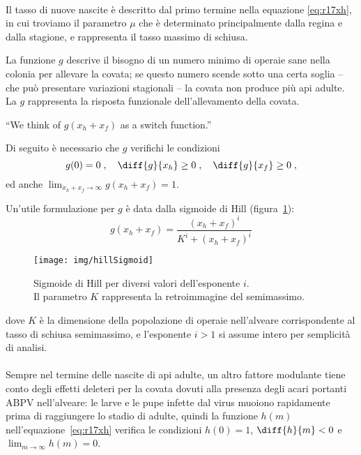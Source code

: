 \paragraph{}
Il tasso di nuove nascite è descritto dal primo termine nella equazione \eqref{eq:r17xh}, in cui troviamo il
parametro $\mu$ che è determinato principalmente dalla regina e dalla stagione, e rappresenta il tasso massimo
di schiusa.

La funzione $g$ descrive il bisogno di un numero minimo di operaie sane nella colonia per allevare la covata; se questo numero scende sotto una certa soglia -- che può presentare variazioni stagionali -- la covata non produce più api adulte.
La $g$ rappresenta la risposta funzionale dell'allevamento della covata.
\begin{displayquote}
``We think of $g(x_h + x_f)$ as a switch function.''
\end{displayquote}

Di seguito è necessario che $g$ verifichi le condizioni
$$g(0)=0 \; , \quad %
\diff{g}{x_h} \geq 0 \; , \quad %
\diff{g}{x_f} \geq 0 \; ,$$
ed anche $\lim_{x_h+x_f \to \infty} g(x_h+x_f)=1$.

Un'utile formulazione per $g$ è data dalla sigmoide di Hill (figura~\ref{img:hillSigmoid}):
\begin{equation}
    g(x_h + x_f) = \frac{ (x_h+x_f)^i }{ K^i + (x_h+x_f)^i }
    \label{eq:hillSigmoid}
\end{equation}

\begin{figure}[hbt]
    \centering %
    \texttt{[image: img/hillSigmoid]}

    \caption[Sigmoidi di Hill.]{Sigmoide di Hill per diversi valori dell'esponente $i$.
        \\ Il parametro $K$ rappresenta la retroimmagine del semimassimo.}
    \label{img:hillSigmoid}
\end{figure}

dove $K$ è la dimensione della popolazione di operaie nell'alveare corrispondente al tasso di schiusa semimassimo, e l'esponente $i>1$ si assume intero per semplicità di analisi.

\paragraph{}
Sempre nel termine delle nascite di api adulte, un altro fattore modulante tiene conto degli effetti deleteri per la covata dovuti alla presenza degli acari portanti ABPV nell'alveare: le larve e le pupe infette dal virus muoiono rapidamente prima di raggiungere lo stadio di adulte, quindi la funzione $h(m)$ nell'equazione~\ref{eq:r17xh} verifica le condizioni $h(0)=1$, $\diff{h}{m} <0$ e $\lim_{m \to \infty} h(m) = 0$.

